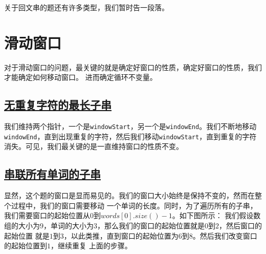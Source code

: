 \documentclass[../../main.tex]{subfiles}
\begin{document}
\begin{kaobox}[title=小结]
  关于回文串的题还有许多类型，我们暂时告一段落。
\end{kaobox}

\section{滑动窗口}

对于滑动窗口的问题，最关键的就是确定好窗口的性质，确定好窗口的性质，我们才能确定如何移动窗口。
进而确定循环不变量。

\subsection{\href{https://leetcode.cn/problems/longest-substring-without-repeating-characters/}
{无重复字符的最长子串}}

我们维持两个指针，一个是\texttt{windowStart}，另一个是\texttt{windowEnd}。我们不断地移动
\texttt{windowEnd}，直到出现重复的字符，然后我们移动\texttt{windowStart}，直到重复的字符
消失。可见，我们最关键的是一直维持窗口的性质不变。



\subsection{\href{https://leetcode.cn/problems/substring-with-concatenation-of-all-words/}
{串联所有单词的子串}}

显然，这个题的窗口是显而易见的。我们的窗口大小始终是保持不变的，然而在整个过程中，我们的窗口需要移动
一个单词的长度。同时，为了遍历所有的子串，我们需要窗口的起始位置从$0$到$words[0].size() - 1$。如下图所示：
我们假设数组的大小为$9$，单词的大小为$3$，那么我们的窗口的起始位置就是$0$到$2$，然后窗口的起始位置
就是$1$到$3$，以此类推，直到窗口的起始位置为$6$到$8$。然后我们改变窗口的起始位置到$1$，继续重复
上面的步骤。


\end{document}
